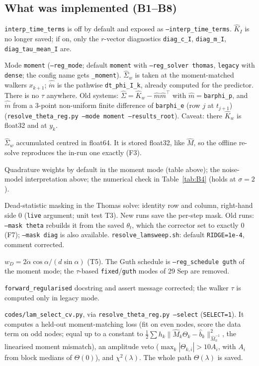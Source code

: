 \documentclass[11pt,a4paper]{article}
\newcommand{\code}[1]{\texttt{#1}}
\begin{document}
\subsection{What was implemented (B1--B8)}
\begin{description}[leftmargin=1.2em,style=nextline]
\item[B1] \code{interp\_time\_terms} is off by default and exposed as \code{--interp\_time\_terms}. $\hat K_I$ is no longer saved; if on, only the $r$-vector
  diagnostics \code{diag\_c\_I}, \code{diag\_m\_I}, \code{diag\_tau\_mean\_I} are.
\item[B2] Mode \code{moment} (\code{--reg\_mode}; default \code{moment} with \code{--reg\_solver thomas}, \code{legacy} with \code{dense}; the config name gets
  \code{\_moment}). $\hat\Sigma_w$ is taken at the moment-matched walkers $x_{k+1}$; $\hat{\dot m}$ is the pathwise \code{dt\_phi\_I\_k}, already
  computed for the predictor. There is no $\tau$ anywhere. Old systems: $\hat\Sigma=\hat K_w-\hat m\hat m^\top$ with $\hat m=$\code{barphi\_p}, and
  $\hat{\dot m}$ from a 3-point non-uniform finite difference of \code{barphi\_e} (row $j$ at $t_{j+1}$) (\code{resolve\_theta\_reg.py --mode moment
  --results\_root}). Caveat: there $\hat K_w$ is float32 and at $y_k$.
\item[B3] $\hat\Sigma_w$ accumulated centred in float64. It is stored float32, like $\hat M$, so the offline re-solve reproduces the in-run one exactly (F3).
\item[B4] Quadrature weights by default in the moment mode (table above); the noise-model interpretation above; the numerical check in Table~\ref{tab:B4} (holds at $\sigma=2$).
\item[B5] Dead-statistic masking in the Thomas solve: identity row and column, right-hand side 0 (\code{live} argument; unit test T3). New runs save
  the per-step mask. Old runs: \code{--mask theta} rebuilds it from the saved $\theta_t$, which the corrector set to exactly 0 (F7); \code{--mask diag}
  is also available. \code{resolve\_lamsweep.sh}: default \code{RIDGE=1e-4}, comment corrected.
\item[B6] $w_D=2\dot\alpha\cos\alpha/(d\sin\alpha)$ (T5). The Guth schedule is \code{--reg\_schedule guth} of the moment mode; the $\tau$-based
  \code{fixed}/\code{guth} modes of 29 Sep are removed.
\item[B7] \code{forward\_regularised} docstring and assert message corrected; the walker $\tau$ is computed only in legacy mode.
\item[B8] \code{codes/lam\_select\_cv.py}, via \code{resolve\_theta\_reg.py --select} (\code{SELECT=1}). It computes a held-out moment-matching loss
  (fit on even nodes, score the data term on odd nodes; equal up to a constant to $\frac12\sum h_k\|\hat M_k\Theta_k-\hat b_k\|^2_{\hat M_k^{-1}}$, the
  linearised moment mismatch), an amplitude veto ($\max_k|\Theta_{k,i}|>10A_i$, with $A_i$ from block medians of $\Theta(0)$), and $\chi^2(\lambda)$.
  The whole path $\Theta(\lambda)$ is saved.
\end{description}
\end{document}
